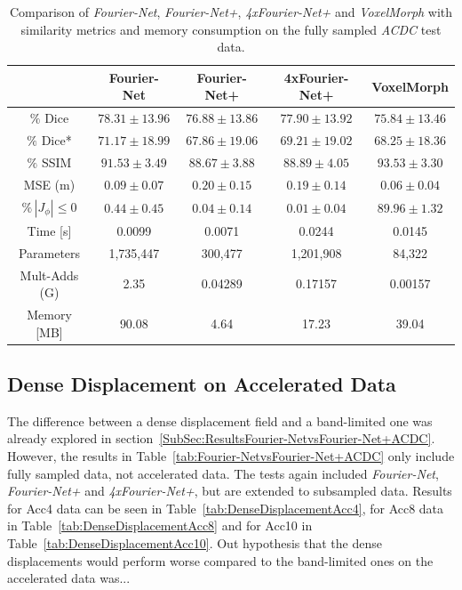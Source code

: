 \documentclass[english,version-2022-01]{uzl-thesis} %
\begin{document}
\begin{table}[h] %
	\centering
	\caption{Comparison of \emph{Fourier-Net}, \emph{Fourier-Net+}, \emph{4xFourier-Net+} and \emph{VoxelMorph} with similarity metrics and memory consumption on the fully sampled \emph{ACDC} test data.}
	\label{tab:CompareVoxelMorph}
	\begin{tabular}{c c c c c} %
		\toprule
		 & Fourier-Net & Fourier-Net+ & 4xFourier-Net+ & VoxelMorph \\		
		\midrule
		$\%$ Dice & $78.31 \pm 13.96$ & $76.88 \pm 13.86$ & $77.90 \pm 13.92$ & $75.84 \pm 13.46$ \\
		$\%$ Dice* & $71.17 \pm 18.99$ & $67.86 \pm 19.06$ & $69.21 \pm 19.02$ & $68.25 \pm 18.36$ \\
		$\%$ SSIM & $91.53 \pm 3.49$ & $88.67 \pm 3.88$ & $88.89 \pm 4.05$ & $93.53 \pm 3.30$ \\
		MSE (m) & $0.09 \pm 0.07$ & $0.20 \pm 0.15$ & $0.19 \pm 0.14$ & $0.06 \pm 0.04$ \\
		$\% \, |J_{\phi}|\leq0$ & $0.44 \pm 0.45$ & $0.04 \pm 0.14$ & $0.01 \pm 0.04$ & $89.96 \pm 1.32$ \\
		Time [s] 	  & 0.0099    & 0.0071 	& 0.0244  	& 0.0145 \\
		Parameters 	  & 1,735,447 & 300,477 	& 1,201,908 	& 84,322 \\
		Mult-Adds (G) & 2.35      & 0.04289  & 0.17157  	& 0.00157 \\
		Memory [MB] 	  & 90.08     & 4.64   	& 17.23    	& 39.04 \\
		\bottomrule
	\end{tabular}		
\end{table}


\subsection{Dense Displacement on Accelerated Data} \label{SubSec:DenseDisplacementAcc}
The difference between a dense displacement field and a band-limited one was already explored in section~\ref{SubSec:ResultsFourier-NetvsFourier-Net+ACDC}. However, the results in Table~\ref{tab:Fourier-NetvsFourier-Net+ACDC} only include fully sampled data, not accelerated data. The tests again included \emph{Fourier-Net}, \emph{Fourier-Net+} and \emph{4xFourier-Net+}, but are extended to subsampled data. Results for Acc4 data can be seen in Table~\ref{tab:DenseDisplacementAcc4}, for Acc8 data in Table~\ref{tab:DenseDisplacementAcc8} and for Acc10 in Table~\ref{tab:DenseDisplacementAcc10}. Out hypothesis that the dense displacements would perform worse compared to the band-limited ones on the accelerated data was...
\end{document}
